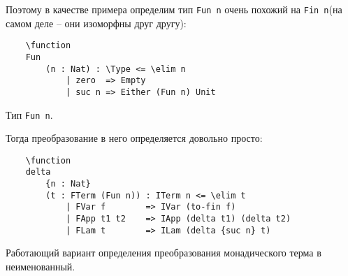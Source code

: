 Поэтому в качестве примера определим тип \texttt{Fun n} очень похожий на \texttt{Fin n}(на самом деле -- они изоморфны друг другу):

\begin{listing}[H]
  \begin{verbatim}
    \function
    Fun
        (n : Nat) : \Type <= \elim n
            | zero  => Empty
            | suc n => Either (Fun n) Unit
  \end{verbatim}
  \caption{Тип \texttt{Fun n}.}
\end{listing}

Тогда преобразование в него определяется довольно просто:

\begin{listing}[H]
  \begin{verbatim}
    \function
    delta
        {n : Nat}
        (t : FTerm (Fun n)) : ITerm n <= \elim t
            | FVar f        => IVar (to-fin f)
            | FApp t1 t2    => IApp (delta t1) (delta t2)
            | FLam t        => ILam (delta {suc n} t)
  \end{verbatim}
  \caption{Работающий вариант определения преобразования монадического терма в неименованный.}
\end{listing}

